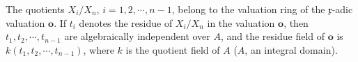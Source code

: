 The quotients $X_i/X_n$, $i=1, 2, \cdots, n-1$, belong to the valuation ring of the $\mathfrak{x}$-adic valuation $\mathbf{o}$. If $t_i$ denotes the residue of $X_i/X_n$ in the valuation $\mathbf{o}$, then $t_1, t_2, \cdots, t_{n-1}$ are algebraically independent over $A$, and the residue field of $\mathbf{o}$ is $k(t_1, t_2, \cdots, t_{n-1})$, where $k$ is the quotient field of $A$ ($A$, an integral domain).